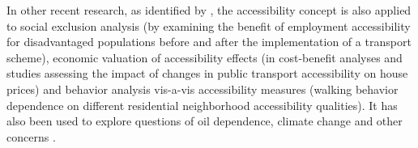 In other recent research, as identified by \citet{GeursEtAl2012AccessibilityTransportIntroduction},
the accessibility concept is also applied to social exclusion analysis (\eg by examining the benefit of
employment accessibility for disadvantaged populations before and after the implementation of a 
transport scheme), economic valuation of accessibility effects (\eg in cost-benefit analyses and studies 
assessing the impact of changes in public transport accessibility on house prices) and behavior analysis 
vis-a-vis accessibility measures (\eg walking behavior dependence on different residential neighborhood accessibility qualities).
It has also been used to explore questions of oil dependence, climate change and 
other concerns \citep{CurtisEtAl2013AccessibilityPolicyInnovation}.



